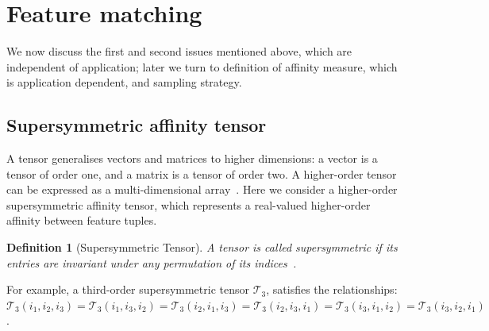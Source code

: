 \section{Feature matching}
\label{sec:supersymhopm}
We now discuss the first and second issues mentioned above, which are independent of application; later we turn to definition of affinity measure, which is application dependent, and sampling strategy.

\subsection{Supersymmetric affinity tensor}
\label{subsec:supersymtensor}

A tensor generalises vectors and matrices to higher dimensions: a vector is a tensor of order one,
and a matrix is a tensor of order two. A higher-order tensor can be expressed as a multi-dimensional array~\cite{Kolda08}.
Here we consider a higher-order supersymmetric affinity tensor, which represents a real-valued higher-order affinity between feature tuples.

\newtheorem{mot}{Definition}
\begin{mot}[Supersymmetric Tensor]
\label{mot:def1}
A tensor is called supersymmetric if its entries are invariant under any permutation of its indices~\cite{Kofidis02}.
\end{mot}

For example, a third-order supersymmetric tensor $\mathcal{T}_3$, satisfies the relationships:
$\mathcal{T}_3(i_1, i_2, i_3)=\mathcal{T}_3(i_1, i_3, i_2)=\mathcal{T}_3(i_2, i_1, i_3)=\mathcal{T}_3(i_2, i_3, i_1)=\mathcal{T}_3(i_3, i_1, i_2)=\mathcal{T}_3(i_3, i_2, i_1)$.

